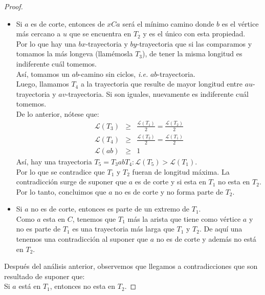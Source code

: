 \documentclass{article}
\begin{document}
\begin{enumerate}
\begin{proof}
\begin{itemize}
            \begin{itemize}
              \item Si $a$ es de corte, entonces de $xCa$ será el mínimo camino donde $b$ es el
                vértice más cercano a $u$ que se encuentra en $T_{2}$ y es el único con esta propiedad. \\
                Por lo que hay una $bx$-trayectoria y $by$-trayectoria que si las comparamos y tomamos la más
                longeva (llamémosla $T_{3}$), de tener la misma longitud es indiferente cuál tomemos. \\
                Así, tomamos un $ab$-camino sin ciclos, \textit{i.e.} $ab$-trayectoria. \\
                Luego, llamamos $T_{4}$ a la trayectoria que resulte de mayor longitud entre $au$-trayectoria
                y $av$-trayectoria. Si son iguales, nuevamente es indiferente cuál tomemos. \\
                De lo anterior, nótese que:
                \begin{eqnarray*}
                  \mathcal{L}(T_3) &\geq& \frac{\mathcal{L}(T_1)}{2} = \frac{\mathcal{L}(T_2)}{2}\\
                  \mathcal{L}(T_4) &\geq& \frac{\mathcal{L}(T_2)}{2} = \frac{\mathcal{L}(T_1)}{2}\\
                  \mathcal{L}(ab) &\geq& 1
                \end{eqnarray*}
                Así, hay una trayectoria $T_{5} = T_{3} ab T_{4}: \mathcal{L}(T_{5}) > \mathcal{L}(T_{1})$. \\
                Por lo que se contradice que $T_{1}$ y $T_{2}$ fueran de longitud máxima. La contradicción surge de
                suponer que $a$ es de corte y si esta en $T_{1}$ no esta en $T_{2}$. \\
                Por lo tanto, concluimos que $a$ no es de corte y no forma parte de $T_{2}$.

              \item Si $a$ no es de corte, entonces es parte de un extremo de $T_{1}$. \\
                Como $a$ esta en $C$, tenemos que $T_{1}$ más la arista que tiene como vértice $a$ y
                no es parte de $T_{1}$ es una trayectoria más larga que $T_{1}$ y $T_{2}$. De aquí una tenemos una
                contradicción al suponer que $a$ no es de corte y además no está en $T_{2}$.
            \end{itemize}
        \end{itemize}
        Después del análisis anterior, observemos que llegamos a contradicciones que son resultado
        de suponer que: \\
        Si $a$ está en $T_{1}$, entonces no esta en $T_{2}$.


\end{proof}
\end{enumerate}
\end{document}

